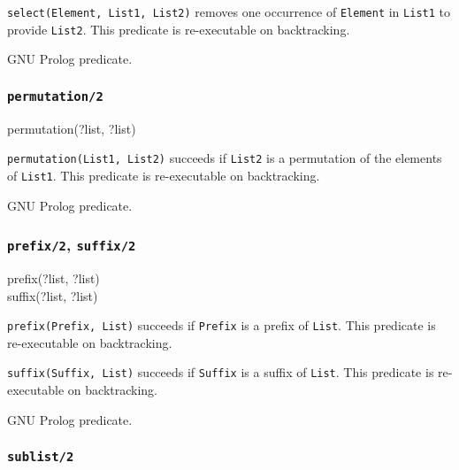 \texttt{select(Element, List1, List2)} removes one occurrence of
\texttt{Element} in \texttt{List1} to provide \texttt{List2}. This predicate
is re-executable on backtracking.

\PlErrorsNone

\Portability

GNU Prolog predicate.

\subsubsection{\texttt{permutation/2}}

\begin{TemplatesOneCol}
permutation(?list, ?list)

\end{TemplatesOneCol}

\Description

\texttt{permutation(List1, List2)} succeeds if \texttt{List2}
is a permutation of the elements of \texttt{List1}. This predicate is
re-executable on backtracking.

\PlErrorsNone

\Portability

GNU Prolog predicate.

\subsubsection{\texttt{prefix/2},
               \texttt{suffix/2}}

\begin{TemplatesOneCol}
prefix(?list, ?list)\\
suffix(?list, ?list)

\end{TemplatesOneCol}

\Description

\texttt{prefix(Prefix, List)} succeeds if \texttt{Prefix} is a prefix of
\texttt{List}. This predicate is re-executable on backtracking.

\texttt{suffix(Suffix, List)} succeeds if \texttt{Suffix} is a suffix of
\texttt{List}. This predicate is re-executable on backtracking.

\PlErrorsNone

\Portability

GNU Prolog predicate.

\subsubsection{\texttt{sublist/2}}


